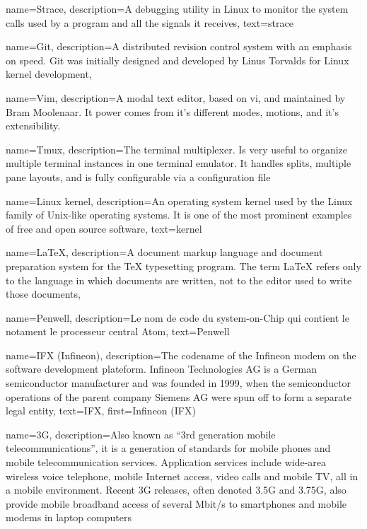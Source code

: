 {
  name=Strace,
  description={A debugging utility in Linux to monitor the system
    calls used by a program and all the signals it receives},
  text=strace
}

{
  name=Git,
  description={A distributed revision control system with an emphasis
    on speed. Git was initially designed and developed by Linus
    Torvalds for Linux kernel development},
}

{
  name=Vim,
  description={A modal text editor, based on vi, and maintained by Bram Moolenaar.
  It power comes from it's different modes, motions, and it's extensibility.}
}

{
  name=Tmux,
  description={The terminal multiplexer. Is very useful to organize multiple terminal instances in
  one terminal emulator. It handles splits, multiple pane layouts, and is fully configurable via a
  configuration file}
}

{
  name=Linux kernel,
  description={An operating system kernel used by the Linux family of
    Unix-like operating systems. It is one of the most prominent
    examples of free and open source software},
  text=kernel
}

{
  name=\LaTeX,
  description={A document markup language and document preparation
    system for the TeX typesetting program. The term LaTeX refers only
    to the language in which documents are written, not to the editor
    used to write those documents},
}

{
  name=Penwell,
  description={Le nom de code du system-on-Chip qui contient le notament le processeur
   central Atom},
  text=Penwell
}

{
  name=IFX (Infineon),
  description={The codename of the Infineon modem on the software
    development plateform. Infineon Technologies AG is a German
    semiconductor manufacturer and was founded in 1999, when the
    semiconductor operations of the parent company Siemens AG were
    spun off to form a separate legal entity},
  text=IFX,
  first=Infineon (IFX)
}

{
  name=3G,
  description={Also known as ``3rd generation mobile
    telecommunications'', it is a generation of standards for mobile
    phones and mobile telecommunication services. Application services
    include wide-area wireless voice telephone, mobile Internet
    access, video calls and mobile TV, all in a mobile
    environment. Recent 3G releases, often denoted 3.5G and 3.75G,
    also provide mobile broadband access of several Mbit/s to
    smartphones and mobile modems in laptop computers}
}

